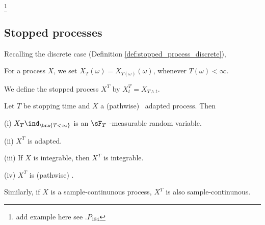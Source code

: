\footnote{add example here see \cite{Rogers_1994}.$P_{184}$}




\subsection{Stopped processes}

Recalling the discrete case (Definition \ref{def:stopped_process_discrete}),

\begin{definition}\label{def:stopped_process_continuous}
For a process $X$, we set $X_T (\omega) = X_{T(\omega)}(\omega)$, whenever $T(\omega) < \infty$. 

We define the stopped process $X^T$ by $X^T_t = X_{T\land t}$.
\end{definition}

\begin{proposition}\label{pro:cadlag_adapted_process_property}
Let $T$ be stopping time and $X$ a (pathwise) \cadlag\ adapted process. Then
\ben
\item [(i)] $X_T\ind_{\bra{T < \infty}}$ is an $\sF_T$ -measurable random variable.
\item [(ii)] $X^T$ is adapted.
\item [(iii)] If $X$ is integrable, then $X^T$ is integrable.
\item [(iv)] $X^T$ is (pathwise) \cadlag.
\een
\end{proposition}

\begin{remark}
Similarly, if $X$ is a sample-continunous process, $X^T$ is also sample-continunous.
\end{remark}

